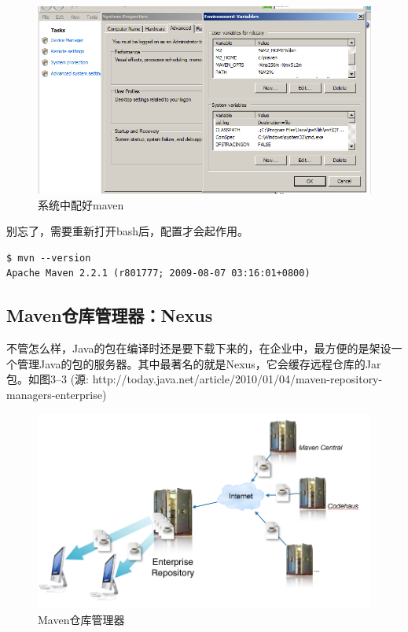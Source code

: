 \begin{figure}[htbp]
\centering
\includegraphics[keepaspectratio,width=\textwidth,height=0.75\textheight]{img/18333fig0302-tn.png}
\caption{系统中配好maven}
\end{figure}

别忘了，需要重新打开bash后，配置才会起作用。

\begin{verbatim}
$ mvn --version
Apache Maven 2.2.1 (r801777; 2009-08-07 03:16:01+0800)
\end{verbatim}

\subsection{Maven仓库管理器：Nexus}
\label{maven仓库管理器：nexus}

不管怎么样，Java的包在编译时还是要下载下来的，在企业中，最方便的是架设一个管理Java的包的服务器。其中最著名的就是Nexus，它会缓存远程仓库的Jar包。如图3--3 (源: http:/\slash today.java.net\slash article\slash 2010\slash 01\slash 04\slash maven-repository-managers-enterprise)

\begin{figure}[htbp]
\centering
\includegraphics[keepaspectratio,width=\textwidth,height=0.75\textheight]{img/18333fig0303-tn.png}
\caption{Maven仓库管理器}
\end{figure}

